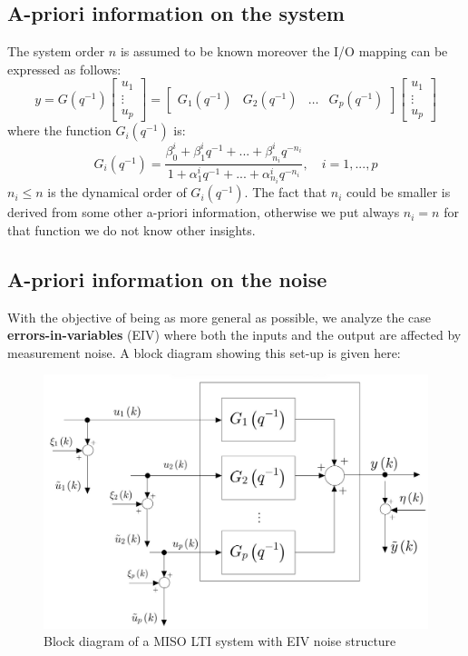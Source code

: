 \subsection{A-priori information on the system}
The system order $n$ is assumed to be known moreover the I/O mapping can be expressed as follows: 
\begin{equation}
    y=G(q^{-1})\begin{bmatrix}
        u_1\\\vdots\\u_p
    \end{bmatrix} = \begin{bmatrix}
        G_1(q^{-1})&G_2(q^{-1})& \dots & G_p(q^{-1})
    \end{bmatrix}\begin{bmatrix}
        u_1\\\vdots\\u_p
    \end{bmatrix}
\end{equation}
where the function $G_i(q^{-1})$ is:
\begin{equation}\label{eq:Gi}
    G_i(q^{-1}) = \frac{
        \beta_0^i+\beta_1^i{q^{-1}}+...+\beta_{n_i}^i{q^{-n_i}}
    }{1+\alpha_1^i{q^{-1}}+...+\alpha_{n_i}^i{q^{-n_i}}
    }, \quad i=1,...,p
\end{equation}
$n_i\le{n}$ is the dynamical order of $G_i(q^{-1})$. The fact that $n_i$ could be smaller is derived from some other a-priori information, otherwise we put always $n_i=n$ for that function we do not know other insights.

\subsection{A-priori information on the noise}
With the objective of being as more general as possible, we analyze the case \textbf{errors-in-variables} (EIV) where both the inputs and the output are affected by measurement noise. A block diagram showing this set-up is given here:
\begin{figure}[h]
    \centering
    \includegraphics[scale=0.19]{img/MISO.jpg}
    \caption{Block diagram of a MISO LTI system with EIV noise structure}
\end{figure}

